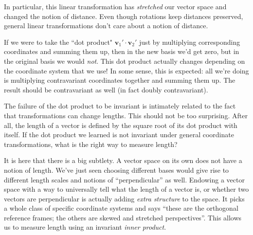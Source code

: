	
	In particular, this linear transformation has \emph{stretched} our vector space and changed the notion of distance. Even though rotations keep distances preserved, general linear transformations don't care about a notion of distance. 
	
	If we were to take the ``dot product" $\mathbf v_1' \cdot \mathbf v_2'$ just by multiplying corresponding coordinates and summing them up, then in the new basis we'd get zero, but in the original basis we would \emph{not}. This dot product actually changes depending on the coordinate system that we use! In some sense, this is expected: all we're doing is multiplying contravariant coordinates together and summing them up. The result should be contravariant as well (in fact doubly contravariant).
	
	
	The failure of the dot product to be invariant is intimately related to the fact that transformations can change lengths. This should not be too surprising. After all, the length of a vector is defined by the square root of its dot product with itself. If the dot product we learned is not invariant under general coordinate transformations, what is the right way to measure length? 
	
	It is here that there is a big subtlety. A vector space on its own does not have a notion of length. We've just seen choosing different bases would give rise to different length scales and notions of ``perpendicular'' as well. Endowing a vector space with a way to universally tell what the length of a vector is, or whether two vectors are perpendicular is actually adding \emph{extra structure} to the space. It picks a whole class of specific coordinate systems and says ``these are the orthogonal reference frames; the others are skewed and stretched perspectives''. This allows us to measure length using an invariant \emph{inner product}. 
	
